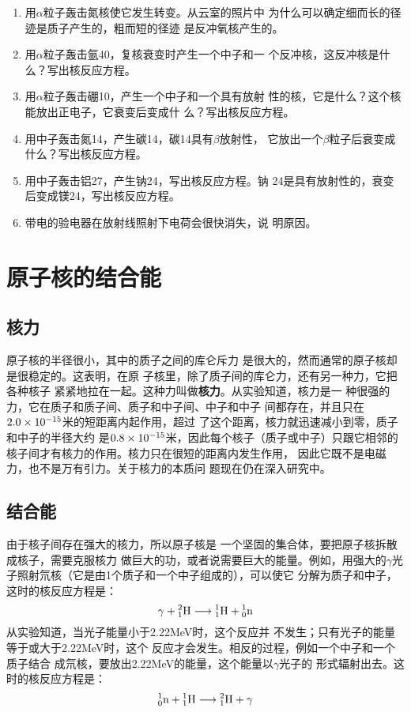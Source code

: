 \begin{enumerate}
    \item 用$\alpha$粒子轰击氮核使它发生转变。从云室的照片中
    为什么可以确定细而长的径迹是质子产生的，粗而短的径迹
    是反冲氧核产生的。
    \item 用$\alpha$粒子轰击氩40，复核衰变时产生一个中子和一
    个反冲核，这反冲核是什么？写出核反应方程。
    \item 用$\alpha$粒子轰击硼10，产生一个中子和一个具有放射
    性的核，它是什么？这个核能放出正电子，它衰变后变成什
    么？写出核反应方程。
    \item 用中子轰击氮14，产生碳14，碳14具有$\beta$放射性，
    它放出一个$\beta$粒子后衰变成什么？写出核反应方程。
    \item 用中子轰击铝27，产生钠24，写出核反应方程。钠
    24是具有放射性的，衰变后变成镁24，写出核反应方程。
    \item 带电的验电器在放射线照射下电荷会很快消失，说
    明原因。
\end{enumerate}


\section{原子核的结合能}
\subsection{核力} 

原子核的半径很小，其中的质子之间的库仑斥力
是很大的，然而通常的原子核却是很稳定的。这表明，在原
子核里，除了质子间的库仑力，还有另一种力，它把各种核子
紧紧地拉在一起。这种力叫做\textbf{核力}。从实验知道，核力是一
种很强的力，它在质子和质子间、质子和中子间、中子和中子
间都存在，并且只在$2.0\x10^{-15}$米的短距离内起作用，超过
了这个距离，核力就迅速减小到零，质子和中子的半径大约
是$0.8\x10^{-15}$米，因此每个核子（质子或中子）只跟它相邻的
核子间才有核力的作用。核力只在很短的距离内发生作用，
因此它既不是电磁力，也不是万有引力。关于核力的本质问
题现在仍在深入研究中。

\subsection{结合能}

由于核子间存在强大的核力，所以原子核是
一个坚固的集合体，要把原子核拆散成核子，需要克服核力
做巨大的功，或者说需要巨大的能量。例如，用强大的$\gamma$光
子照射氘核（它是由1个质子和一个中子组成的），可以使它
分解为质子和中子，这时的核反应方程是：
\[\gamma +\atom{H}{2}{1}\longrightarrow \atom{H}{1}{1}+\atom{n}{1}{0} \]
从实验知道，当光子能量小于2.22MeV时，这个反应并
不发生；只有光子的能量等于或大于2.22MeV时，这个
反应才会发生。相反的过程，例如一个中子和一个质子结合
成氘核，要放出2.22MeV的能量，这个能量以$\gamma$光子的
形式辐射出去。这时的核反应方程是：
\[\atom{n}{1}{0}+ \atom{H}{1}{1}\longrightarrow \atom{H}{2}{1} +\gamma  \]


